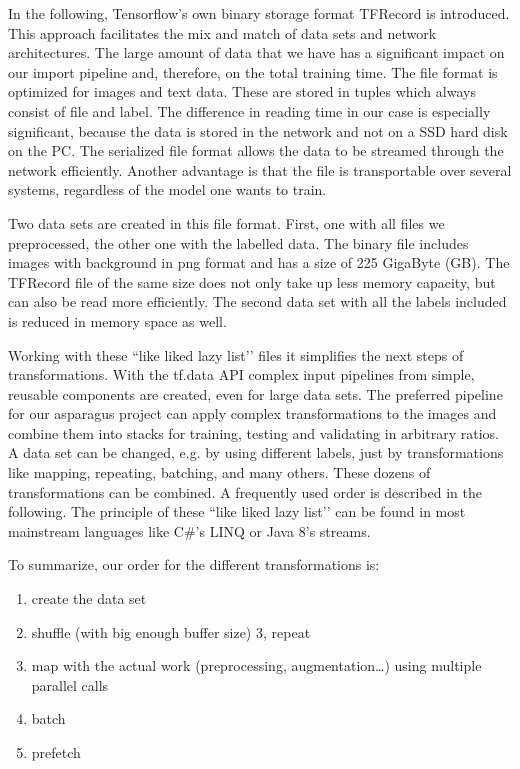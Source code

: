 \bigskip
In the following, Tensorflow's own binary storage format TFRecord is introduced. This approach facilitates the mix and match of data sets and network architectures. The large amount of data that we have has a significant impact on our import pipeline and, therefore, on the total training time. The file format is optimized for images and text data. These are stored in tuples which always consist of file and label. The difference in reading time in our case is especially significant, because the data is stored in the network and not on a SSD hard disk on the PC. The serialized file format allows the data to be streamed through the network efficiently. Another advantage is that the file is transportable over several systems, regardless of the model one wants to train.

Two data sets are created in this file format. First, one with all files we preprocessed, the other one with the labelled data.
The binary file includes images with background in png format and has a size of 225 GigaByte (GB). The TFRecord file of the same size does not only take up less memory capacity, but can also be read more efficiently. The second data set with all the labels included is reduced in memory space as well.

Working with these ``like liked lazy list’’ files it simplifies the next steps of transformations. With the tf.data API complex input pipelines from simple, reusable components are created, even for large data sets. The preferred pipeline for our asparagus project can apply complex transformations to the images and combine them into stacks for training, testing and validating in arbitrary ratios. A data set can be changed, e.g. by using different labels, just by transformations like mapping, repeating, batching, and many others. These dozens of transformations can be combined. A frequently used order is described in the following. The principle of these ``like liked lazy list’’ can be found in most mainstream languages like C\#'s LINQ or Java 8's streams.


To summarize, our order for the different transformations is:
\begin{enumerate}
\item create the data set
\item shuffle (with big enough buffer size) 3, repeat
\item map with the actual work (preprocessing, augmentation…) using multiple parallel calls
\item batch
\item prefetch
\end{enumerate}

